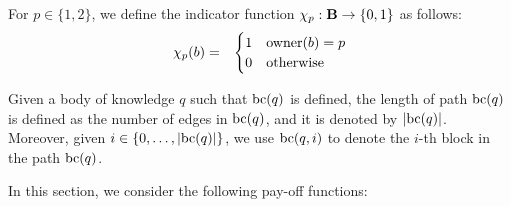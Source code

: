\documentclass{article}
\begin{document}
For $p \in \{1,2\}$, we define the indicator  function $\chi_p : \mathbf{B} \to \{0,1\}$ as follows:
\begin{eqnarray*}
\chi_p(b) & = & 
\begin{cases}
1 & \text{owner}(b) = p\\
0 & \text{otherwise}
\end{cases}
\end{eqnarray*}

Given a body of knowledge $q$ such that $\text{bc}(q)$ is defined, the length of path $\text{bc}(q)$ is defined as the number of edges in $\text{bc}(q)$, and it is denoted by $|\text{bc}(q)|$. Moreover, given $i \in \{0, \ldots, |\text{bc}(q)|\}$, we use $\text{bc}(q,i)$ to denote the $i$-th block in the path $\text{bc}(q)$.

In this section, we consider the following pay-off functions:
\end{document}
